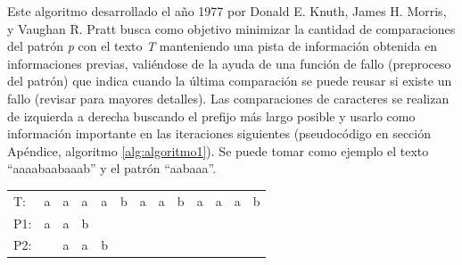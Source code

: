 Este algoritmo desarrollado el año 1977 por Donald E. Knuth, James H. Morris, y Vaughan R. Pratt busca como objetivo minimizar la cantidad de comparaciones del patrón \textit{p} con el texto \textit{T} manteniendo una pista de información obtenida en informaciones previas, valiéndose de la ayuda de una función de fallo (preproceso del patrón) que indica cuando la última comparación se puede reusar si existe un fallo (revisar \cite{knuthmorrispratt} para mayores detalles). Las comparaciones de caracteres se realizan de izquierda a derecha buscando el prefijo más largo posible y usarlo como información importante en las iteraciones siguientes (pseudocódigo en sección Apéndice, algoritmo \ref{alg:algoritmo1}). Se puede tomar como ejemplo el texto ``aaaabaabaaab'' y el patrón ``aabaaa''.
\\
\begin{table}[h]
\centering
\label{my-label6}
\begin{tabular}{lllllllllllll}
\cline{2-13}
\multicolumn{1}{l|}{T:} & \multicolumn{1}{l|}{a} & \multicolumn{1}{l|}{a} & \multicolumn{1}{l|}{a}                         & \multicolumn{1}{l|}{a}                         & \multicolumn{1}{l|}{b} & \multicolumn{1}{l|}{a}                         & \multicolumn{1}{l|}{a}                         & \multicolumn{1}{l|}{b}                         & \multicolumn{1}{l|}{a}                         & \multicolumn{1}{l|}{a}                         & \multicolumn{1}{l|}{a}                         & \multicolumn{1}{l|}{b} \\ \cline{2-13} 
\multicolumn{1}{l}{P1:}   & \multicolumn{1}{l}{a} & \multicolumn{1}{l}{a} & \multicolumn{1}{l}{\cellcolor[HTML]{FD6864}b} &                                                &                        &                                                &                                                &                                                &                                                &                                                &                                                &                        \\ 
P2:               & \multicolumn{1}{l}{}  & \multicolumn{1}{l}{a} & \multicolumn{1}{l}{a}                         & \multicolumn{1}{l}{\cellcolor[HTML]{FD6864}b} &                        &                                                &                                                &                                                &                                                &                                                &                                                &                        \\

\end{tabular}
\end{table}
